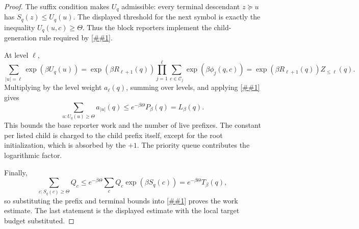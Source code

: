 \documentclass[10pt]{article}
\newcommand{\cref}[1]{\ref{##1}}
\theoremstyle{definition}
\begin{document}
\begin{proof}
   The suffix condition makes \(U_q\) admissible: every terminal descendant
   \(z\succeq u\) has \(S_q(z)\le U_q(u)\).  The displayed threshold for the
   next symbol is exactly the inequality \(U_q(u,c)\ge\Theta\).  Thus the block
   reporters implement the child-generation rule required by
   \cref{lem:priority-prefix-list-decoder}.

   At level \(\ell\),
   \[
      \sum_{|u|=\ell}\exp(\beta U_q(u))
      =
      \exp(\beta R_{\ell+1}(q))
      \prod_{j=1}^{\ell}
      \sum_{c\in\mathcal C_j}\exp(\beta\phi_j(q,c))
      =
      \exp(\beta R_{\ell+1}(q))Z_{\le\ell}(q).
   \]
   Multiplying by the level weight \(a_\ell(q)\), summing over levels, and
   applying \cref{lem:exponential-list-size} gives
   \[
      \sum_{u:U_q(u)\ge\Theta}a_{|u|}(q)
      \le e^{-\beta\Theta}P_\beta(q)=L_\beta(q).
   \]
   This bounds the base reporter work and the number of live prefixes.  The
   constant per listed child is charged to the child prefix itself, except for
   the root initialization, which is absorbed by the \(+1\).  The priority
   queue contributes the logarithmic factor.

   Finally,
   \[
      \sum_{c:S_q(c)\ge\Theta}Q_c
      \le
      e^{-\beta\Theta}
      \sum_c Q_c\exp(\beta S_q(c))
      =
      e^{-\beta\Theta}T_\beta(q),
   \]
   so substituting the prefix and terminal bounds into
   \cref{lem:priority-prefix-list-decoder} proves the work estimate.  The last
   statement is the displayed estimate with the local target budget substituted.
\end{proof}
\end{document}
